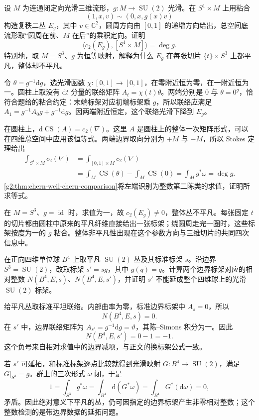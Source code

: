 \begin{exercise}\label{g2:ex:gauge-mapping-torus-second-chern}
	设 \(M\) 为连通闭定向光滑三维流形，\(g:M\to\operatorname{SU}(2)\) 光滑。在 \(S^1\times M\) 上用粘合
	\[
		(1,x,v)\sim(0,x,g(x)v)
	\]
	构造复秩二丛 \(E_g\)，其中 \(v\in\mathbb C^2\)，圆周方向由 \([0,1]\) 的递增方向给出，总空间底流形取“圆周在前、\(M\) 在后”的乘积定向。证明
	\[
		\langle c_2(E_g),[S^1\times M]\rangle=\deg g.
	\]
	特别地，取 \(M=S^3\)、\(g\) 为恒等映射，解释为什么 \(E_g\) 在每张切片 \(\{t\}\times S^3\) 上都平凡，整体却不平凡。
\end{exercise}
\begin{solution}
	令 \(\theta=g^{-1}\mathrm dg\)，选光滑函数 \(\chi:[0,1]\to[0,1]\)，在零附近恒为零，在一附近恒为一。圆柱上取没有 \(\mathrm dt\) 分量的联络矩阵 \(A_t=\chi(t)\theta\)。两端分别是 \(0\) 与 \(\theta=0^g\)，恰符合题给的粘合约定：末端标架对应初端标架乘 \(g\)，所以联络应满足 \(A_1=g^{-1}A_0g+g^{-1}\mathrm dg\)。因两端附近恒定，这个联络光滑下降到 \(E_g\)。

	在圆柱上，\(\mathrm d\operatorname{CS}(A)=c_2(\nabla)\)。这里 \(A\) 是圆柱上的整体一次矩阵形式，可以在四维总空间中应用该恒等式。两端边界取向分别为 \(+M\) 与 \(-M\)，所以 Stokes 定理给出
	\[
	\begin{aligned}
		\int_{S^1\times M}c_2(\nabla)
		&=\int_{[0,1]\times M}c_2(\nabla)\\
		&=\int_M\operatorname{CS}(\theta)-\int_M\operatorname{CS}(0)
		=\int_Mg^*\omega=\deg g.
	\end{aligned}
	\]
	\cref{g2:thm:chern-weil-chern-comparison}将左端识别为整数第二陈类的求值，证明所求等式。

	在 \(M=S^3\)、\(g=\operatorname{id}\) 时，求值为一，故 \(c_2(E_g)\ne0\)，整体丛不平凡。每张固定 \(t\) 的切片都由圆柱中原来的平凡纤维直接给出一张标架；绕圆周走完一圈时，这些标架按度为一的 \(g\) 粘合。整体非平凡性出现在这个参数方向与三维切片的共同四次信息中。
\end{solution}

\begin{exercise}\label{g2:ex:relative-trivial-bundle-nontrivial-framing}
	在正向四维单位球 \(B^4\) 上取平凡 \(\operatorname{SU}(2)\) 丛及其标准标架 \(s\)。沿边界 \(S^3=\operatorname{SU}(2)\)，改取标架 \(s'=sg\)，其中 \(g(q)=q\)。计算两个边界标架对应的相对整数 \(N(B^4,E,s)\)、\(N(B^4,E,s')\)，并证明 \(s'\) 不能延成整个四维球上的光滑 \(\operatorname{SU}(2)\) 标架。
\end{exercise}
\begin{solution}
	给平凡丛取标准平坦联络。内部曲率为零，标准边界标架中 \(A_s=0\)，所以
	\[
		N(B^4,E,s)=0.
	\]
	在 \(s'\) 中，边界联络矩阵为 \(A_{s'}=g^{-1}\mathrm dg=\vartheta\)，其陈--Simons 积分为一。因此
	\[
		N(B^4,E,s')=0-1=-1.
	\]
	这个负号来自相对求值中的边界减项，与正文的换标架公式一致。

	若 \(s'\) 可延拓，和标准标架逐点比较就得到光滑映射 \(G:B^4\to\operatorname{SU}(2)\)，满足 \(G|_{S^3}=g\)。群上的三次形式 \(\omega\) 闭，于是
	\[
		1=\int_{S^3}g^*\omega=\int_{B^4}\mathrm d(G^*\omega)=\int_{B^4}G^*(\mathrm d\omega)=0,
	\]
	矛盾。因此绝对意义下平凡的丛，仍可因指定的边界标架产生非零相对整数；这个整数检测的是带边界数据的延拓问题。
\end{solution}
